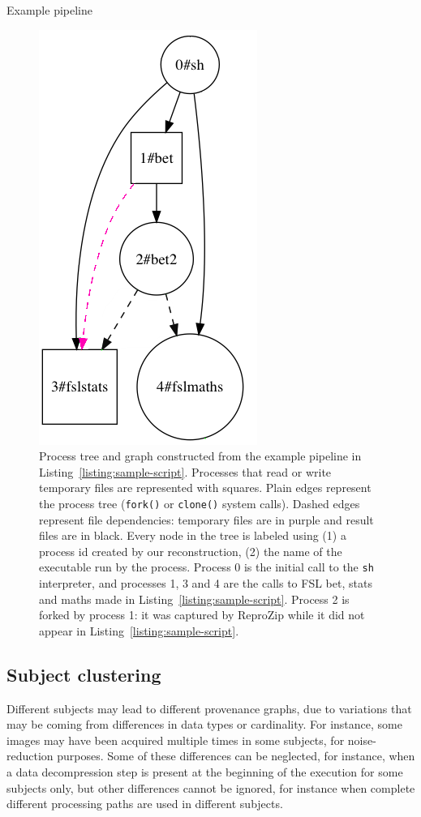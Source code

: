 \documentclass[a4paper,num-refs]{oup-contemporary}
\newcommand{\reprozip}[0]{ReproZip\xspace}
\begin{document}
\begin{listing}
  \inputminted{bash}{"bin/example.sh"}
  \caption{Example pipeline}
  \label{listing:sample-script}
\end{listing}

\begin{figure}
\centering
  \includegraphics[width=0.3\columnwidth]{images/simple_graph}
  \caption{Process tree and graph
  constructed from the example pipeline in
  Listing~\ref{listing:sample-script}.
  Processes that read or write
  temporary files are 
  represented with squares. Plain edges 
  represent the process tree (\texttt{fork()} or \texttt{clone()} 
  system calls). Dashed edges represent file dependencies: temporary 
  files are in purple and result files are in black.
  Every node in the tree is labeled using (1) a process id created by our
  reconstruction, (2) the name of the executable run by the process.
  Process 0 is the initial call to the \texttt{sh} interpreter, and
  processes 1, 3 and 4 are the calls to FSL bet, stats and maths made in
  Listing~\ref{listing:sample-script}. Process 2 is forked by process 1: it
  was captured by \reprozip while it did not appear in
  Listing~\ref{listing:sample-script}. 
}
  \label{fig:simple_script}
\end{figure}


\subsection{Subject clustering}

Different subjects may lead to different provenance graphs, due to
variations that may be coming from differences in data types or
cardinality. For instance, some images may have been acquired multiple
times in some subjects, for noise-reduction purposes. Some of these
differences can be neglected, for instance, when a data decompression step
is present at the beginning of the execution for some subjects only, but
other differences cannot be ignored, for instance when complete different
processing paths are used in different subjects. 
\end{document}
